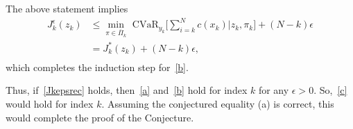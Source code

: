 \documentclass[letterpaper, 10 pt, conference]{ieeeconf}  %
\begin{document}
%
The above statement implies
%
\begin{equation*}\begin{aligned}
J_k^\epsilon(z_k) & \leq {\underset{\pi \in \bar{\Pi}_k} \min} \text{ CVaR}_{y_k}\big[\textstyle \sum_{i=k}^N c(x_k)|z_k, \pi_k\big] + (N-k)\epsilon \\
& = J_k^*(z_k) + (N-k)\epsilon, \\
\end{aligned}\end{equation*}
%
which completes the induction step for~\eqref{b}. 

Thus, if~\eqref{Jkepsrec} holds, then~\eqref{a} and~\eqref{b} hold for index $k$ for any $\epsilon>0$. So,~\eqref{c} would hold for index $k$. 
Assuming the conjectured equality (a) is correct, this would complete the proof of the Conjecture.
\addtolength{\textheight}{-2cm}   %


\end{document}
